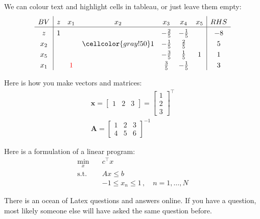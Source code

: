 \documentclass{article}
\newcommand\Tstrut{\rule{0pt}{2.6ex}}         %
\newcommand\Bstrut{\rule[-0.9ex]{0pt}{0pt}}   %
\begin{document}
We can colour text and highlight cells in tableau, or just leave them empty:
\begin{align}
    \begin{array}{c | cccccc | c}
         BV  & z & x_1 & x_2 & x_3 & x_4 & x_5 & RHS \Tstrut\Bstrut \\ 
         \hline
         z   & 1 & & & -\tfrac{2}{5} & -\tfrac{1}{5} & & -8 \Tstrut\Bstrut \\
         x_2 & & & \cellcolor{gray!50}1 & -\tfrac{1}{5} & \tfrac{2}{5} & & 5 \Tstrut\Bstrut \\
         x_5 & & & & -\tfrac{3}{5} & \tfrac{1}{5}  & 1 & 1 \Tstrut\Bstrut \\
         x_1 & & \textcolor{red}{1} & & \tfrac{3}{5}  & -\tfrac{1}{5} & & 3 \Tstrut\Bstrut
    \end{array}
\end{align}

Here is how you make vectors and matrices:
\begin{align}
    \mathbf x = \begin{bmatrix} 1 & 2 & 3 \end{bmatrix} = \begin{bmatrix} 1 \\ 2 \\ 3 \end{bmatrix}^\top \\
    \mathbf A = \begin{bmatrix} 1 & 2 & 3 \\ 4 & 5 & 6 \end{bmatrix}^{-1}
\end{align}

Here is a formulation of a linear program:
\begin{align*}
    \min_{x} \quad & c^\top x \\
    \mathrm{s.t.} \quad 
    & A x \leq b \\
    &-1 \leq x_n \leq 1 \,, \quad n = 1, \dots, N
\end{align*}

There is an ocean of Latex questions and answers online. If you have a question, most likely someone else will have asked the same question before. 

\medskip
 


\end{document}

